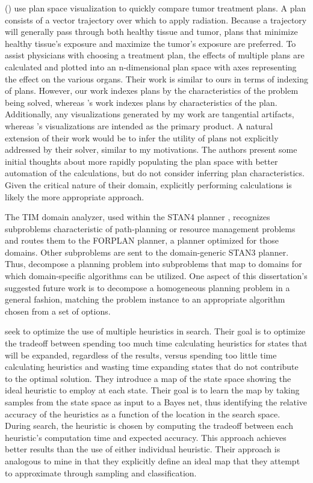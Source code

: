 \citeauthor{gopal02plan} (\citeyear{gopal02plan}) use plan space visualization to quickly compare tumor treatment plans.  A plan consists of a vector trajectory over which to apply radiation.  Because a trajectory will generally pass through both healthy tissue and tumor, plans that minimize healthy tissue's exposure and maximize the tumor's exposure are preferred.  To assist physicians with choosing a treatment plan, the effects of multiple plans are calculated and plotted into an n-dimensional plan space with axes representing the effect on the various organs.  Their work is similar to ours in terms of indexing of plans.  However, our work indexes plans by the characteristics of the problem being solved, whereas \citeauthor{gopal02plan}'s work indexes plans by characteristics of the plan.  Additionally, any visualizations generated by my work are tangential artifacts, whereas \citeauthor{gopal02plan}'s visualizations are intended as the primary product.  A natural extension of their work would be to infer the utility of plans not explicitly addressed by their solver, similar to my motivations.  The authors present some initial thoughts about more rapidly populating the plan space with better automation of the calculations, but do not consider inferring plan characteristics.  Given the critical nature of their domain, explicitly performing calculations is likely the more appropriate approach.

The TIM domain analyzer, used within the STAN4 planner \citep{fox01hybrid}, recognizes subproblems characteristic of path-planning or resource management problems and routes them to the FORPLAN planner, a planner optimized for those domains.  Other subproblems are sent to the domain-generic  STAN3 planner.  Thus, \citeauthor{fox01hybrid} decompose a planning problem into subproblems that map to domains for which domain-specific algorithms can be utilized.  One aspect of this dissertation's suggested future work is to decompose a homogeneous planning problem in a general fashion, matching the problem instance to an appropriate algorithm chosen from a set of options.


\cite{domshla10max} seek to optimize the use of multiple heuristics in search.  Their goal is to optimize the tradeoff between spending too much time calculating heuristics for states that will be expanded, regardless of the results, versus spending too little time calculating heuristics and wasting time expanding states that do not contribute to the optimal solution.  They introduce a map of the state space showing the ideal heuristic to employ at each state. Their goal is to learn the map by taking samples from the state space as input to a Bayes net, thus identifying the relative accuracy of the  heuristics as a function of the location in the search space.  During search, the heuristic is chosen by computing the tradeoff between each heuristic's computation time and expected accuracy. This approach achieves better results than the use of either individual heuristic.  Their approach is analogous to mine in that they explicitly define an ideal map that they attempt to approximate through sampling and classification.



